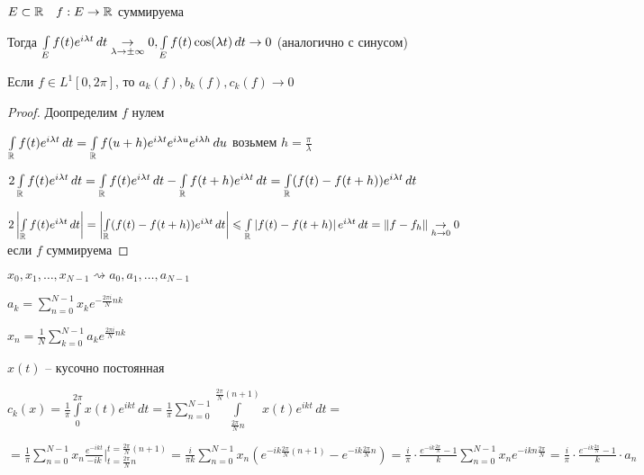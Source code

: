 
\begin{lemma}\thmslashn
	
	$E \subset\mathbb{R} \quad f: E \to \mathbb{R}$ суммируема
	
	Тогда $\int\limits_{E} f(t)e^{i\lambda t}\, dt \underset{\lambda \to \pm \infty}\to 0, \int\limits_{E} f(t) \cos(\lambda t) \, dt \to 0$ (аналогично с синусом)
	
\end{lemma}

\begin{consequence}\thmslashn
	
	Если $f\in L^1[0, 2\pi]$, то $a_k(f), b_k(f), c_k(f) \to 0$
	
\end{consequence}

\begin{proof}\thmslashn

	Доопределим $f$ нулем
	
	$\int\limits_{\mathbb{R}} f(t)e^{i\lambda t}\, dt = \int\limits_{\mathbb{R}} f(u + h)e^{i\lambda t} e^{i\lambda u} e^{i\lambda h}\, du$ возьмем $h = \frac{\pi}{\lambda}$
	
	$2\int\limits_{\mathbb{R}} f(t)e^{i\lambda t}\, dt = \int\limits_{\mathbb{R}} f(t)e^{i\lambda t}\, dt - \int\limits_{\mathbb{R}} f(t + h)e^{i\lambda t}\, dt = \int\limits_{\mathbb{R}} (f(t) -f(t + h))e^{i\lambda t}\, dt$

	$2\left|\int\limits_{\mathbb{R}} f(t)e^{i\lambda t}\, dt\right| = \left|\int\limits_{\mathbb{R}} (f(t) -f(t + h))e^{i\lambda t}\, dt\right| \leqslant  \int\limits_{\mathbb{R}} \left|f(t) -f(t + h)\right|e^{i\lambda t}\, dt = \left\|f - f_h\right\|\underset{h\to 0}\to0$ если $f$ суммируема

\end{proof}

\begin{example}\thmslashn

	$x_0, x_1, \ldots, x_{N-1} \rightsquigarrow a_0, a_1, \ldots, a_{N-1}$
	
	$a_k = \sum\limits_{n = 0}^{N-1} x_k e^{-\frac{2\pi i}{N} nk}$
	
	$x_n = \frac{1}{N}\sum\limits_{k = 0}^{N-1} a_k e^{\frac{2\pi i}{N} nk}$
	
	$x(t)$ -- кусочно постоянная
	
	$c_k(x) = \frac{1}{\pi}\int\limits_{0}^{2\pi} x(t) e^{i k t}\, dt = \frac{1}{\pi} \sum\limits_{n = 0}^{N - 1}\int\limits_{\frac{2\pi}{N}n}^{\frac{2\pi}{N}(n+1)}x(t) e^{ikt}\,dt = $
	
	$ = \frac{1}{\pi} \sum\limits_{n = 0}^{N-1} x_n\frac{e^{-ikt}}{-ik}\Big|_{t = \frac{2\pi}{N}n}^{t = \frac{2\pi}{N}(n+1)} = \frac{i}{\pi k} \sum\limits_{n = 0}^{N - 1} x_{n}\left(e^{-ik\frac{2\pi}{N}(n+1)} - e^{-ik\frac{2\pi}{N}n}\right) = \frac{i}{\pi}\cdot\frac{e^{-ik\frac{2\pi}{N}} - 1}{k} \sum\limits_{n = 0}^{N-1} x_n e^{-ikn\frac{2\pi}{N}} =  \frac{i}{\pi}\cdot\frac{e^{-ik\frac{2\pi}{N}} - 1}{k} \cdot a_n$
	
\end{example}


